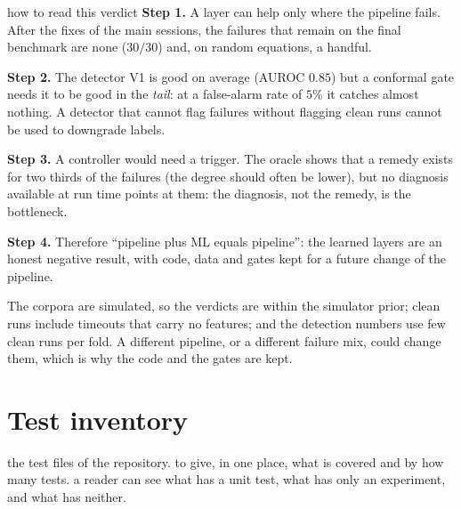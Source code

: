 \begin{explained}{how to read this verdict}
\textbf{Step 1.} A layer can help only where the pipeline fails. After the fixes of the main sessions, the failures that remain on the final benchmark are none ($30/30$) and, on random equations, a handful.

\medskip\textbf{Step 2.} The detector V1 is good on average (AUROC $0.85$) but a conformal gate needs it to be good in the \emph{tail}: at a false-alarm rate of $5\%$ it catches almost nothing. A detector that cannot flag failures without flagging clean runs cannot be used to downgrade labels.

\medskip\textbf{Step 3.} A controller would need a trigger. The oracle shows that a remedy exists for two thirds of the failures (the degree should often be lower), but no diagnosis available at run time points at them: the diagnosis, not the remedy, is the bottleneck.

\medskip\textbf{Step 4.} Therefore ``pipeline plus ML equals pipeline'': the learned layers are an honest negative result, with code, data and gates kept for a future change of the pipeline.
\end{explained}

\begin{caution}[title=Limits of this evaluation]
The corpora are simulated, so the verdicts are within the simulator prior; clean runs include timeouts that carry no features; and the detection numbers use few clean runs per fold. A different pipeline, or a different failure mix, could change them, which is why the code and the gates are kept.
\end{caution}

\section{Test inventory}\label{sec:tests}
\sectionbrief
{the test files of the repository.}
{to give, in one place, what is covered and by how many tests.}
{a reader can see what has a unit test, what has only an experiment, and what has neither.}

